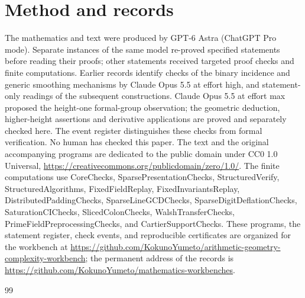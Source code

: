 \documentclass[11pt,a4paper]{article}
\theoremstyle{definition}
\theoremstyle{remark}\newtheorem{remark}[theorem]{Remark}
\newcommand{\workbenchurl}{https://github.com/KokunoYumeto/arithmetic-geometry-complexity-workbench}
\newcommand{\recordurl}{https://github.com/KokunoYumeto/mathematics-workbenches}
\begin{document}
\section*{Method and records}
The mathematics and text were produced by GPT-6 Astra (ChatGPT Pro mode). Separate instances of the same model re-proved specified statements before reading their proofs; other statements received targeted proof checks and finite computations. Earlier records identify checks of the binary incidence and generic smoothing mechanisms by Claude Opus 5.5 at effort high, and statement-only readings of the subsequent constructions. Claude Opus 5.5 at effort max proposed the height-one formal-group observation; the geometric deduction, higher-height assertions and derivative applications are proved and separately checked here. The event register distinguishes these checks from formal verification. No human has checked this paper. The text and the original accompanying programs are dedicated to the public domain under CC0 1.0 Universal, \url{https://creativecommons.org/publicdomain/zero/1.0/}. The finite computations use CoreChecks, SparsePresentationChecks, StructuredVerify, StructuredAlgorithms, FixedFieldReplay, FixedInvariantsReplay, DistributedPaddingChecks, SparseLineGCDChecks, SparseDigitDeflationChecks, SaturationCIChecks, SlicedColonChecks, WalshTransferChecks, PrimeFieldPreprocessingChecks, and CartierSupportChecks. These programs, the statement register, check events, and reproducible certificates are organized for the workbench at \url{\workbenchurl}; the permanent address of the records is \url{\recordurl}.

\begin{thebibliography}{99}


\end{thebibliography}
\end{document}
